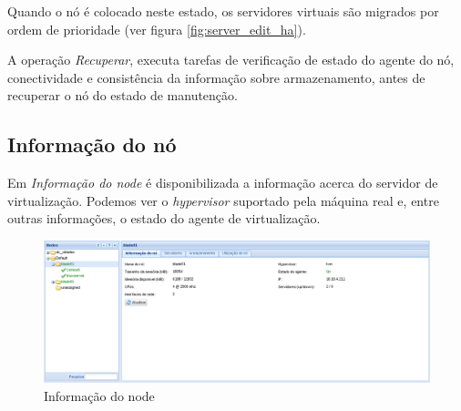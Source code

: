 Quando o nó é colocado neste estado, os servidores virtuais são migrados por ordem de prioridade (ver figura \ref{fig:server_edit_ha}).

A operação \emph{Recuperar}, executa tarefas de verificação de estado do agente do nó, conectividade e consistência da informação sobre armazenamento, antes de recuperar o nó do estado de manutenção.

\subsection{Informação do nó}
\label{sec:nodeinfo}
Em \emph{Informação do node} é disponibilizada a informação acerca do servidor de virtualização. Podemos ver o \emph{hypervisor} suportado pela máquina real e, entre outras informações, o estado do agente de virtualização.

\begin{figure}[H]
	\begin{center}
	\includegraphics[scale=0.45]{screenshots/node_info.png}
	\caption{Informação do node}
	\label{fig:node_info}
	\end{center}
\end{figure}

